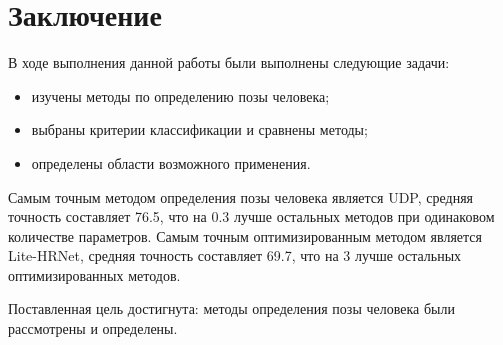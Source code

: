\chapter*{Заключение}

В ходе выполнения данной работы были выполнены следующие задачи:
\begin{itemize}
	\item изучены методы по определению позы человека;
	\item выбраны критерии классификации и сравнены методы;
	\item определены области возможного применения.
\end{itemize}

Самым точным методом определения позы человека является UDP, средняя точность составляет 76.5, что на 0.3 лучше остальных методов при одинаковом количестве параметров. Самым точным оптимизированным методом является Lite-HRNet, средняя точность составляет 69.7, что на 3 лучше остальных оптимизированных методов.

Поставленная цель достигнута: методы определения позы человека были рассмотрены и определены.